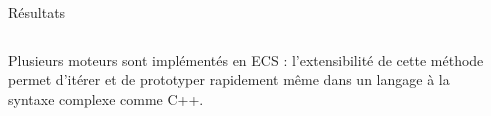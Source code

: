 \begin{columns}[t]
\begin{column}{\onecolwid}
\begin{block}{Résultats}
          	\begin{columns}[t]
          		\begin{column}{\onecolwid}\justify
                      Plusieurs moteurs sont implémentés en ECS : l'extensibilité de cette méthode permet d'itérer et de prototyper rapidement même dans un langage à la syntaxe complexe comme C++.
          		\end{column}
          	\end{columns}        
            \end{block}
        \end{column}         
   \begin{column}{\sepwid}\end{column}		
\end{columns}

